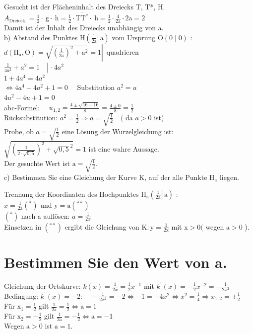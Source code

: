 \documentclass[10pt]{article}
\begin{document}
Gesucht ist der Flächeninhalt des Dreiecks T, T*, H.\\
$A_{\text {Dreieck }}=\frac{1}{2} \cdot \mathrm{~g} \cdot \mathrm{~h}=\frac{1}{2} \cdot \overline{\mathrm{TT}^{*}} \cdot \mathrm{~h}=\frac{1}{2} \cdot \frac{4}{2 \mathrm{a}} \cdot 2 \mathrm{a}=2$\\
Damit ist der Inhalt des Dreiecks unabhängig von a.\\
b) Abstand des Punktes $\mathrm{H}\left(\left.\frac{1}{2 \mathrm{a}} \right\rvert\, \mathrm{a}\right)$ vom Ursprung $\mathrm{O}(0 \mid 0)$ :\\
$\left.d\left(\mathrm{H}_{\mathrm{a}}, \mathrm{O}\right)=\sqrt{\left(\frac{1}{2 \mathrm{a}}\right)^{2}+\mathrm{a}^{2}}=1 \right\rvert\,$ quadrieren\\
$\left.\frac{1}{4 a^{2}}+a^{2}=1 \quad \right\rvert\, \cdot 4 a^{2}$\\
$1+4 a^{4}=4 a^{2}$\\
$\Leftrightarrow 4 a^{4}-4 a^{2}+1=0 \quad$ Substitution $a^{2}=u$\\
$4 u^{2}-4 u+1=0$\\
abc-Formel: $\quad u_{1,2}=\frac{4 \pm \sqrt{16-16}}{8}=\frac{4 \pm 0}{8}=\frac{1}{2}$\\
Rücksubstitution: $a^{2}=\frac{1}{2} \Rightarrow a=\sqrt{\frac{1}{2}} \quad($ da $a>0$ ist)\\
Probe, ob $a=\sqrt{\frac{1}{2}}$ eine Lösung der Wurzelgleichung ist:\\
$\sqrt{\left(\frac{1}{2 \cdot \sqrt{0,5}}\right)^{2}+\sqrt{0,5}^{2}}=1$ ist eine wahre Aussage.\\
Der gesuchte Wert ist $\mathrm{a}=\sqrt{\frac{1}{2}}$.\\
c) Bestimmen Sie eine Gleichung der Kurve K, auf der alle Punkte $\mathrm{H}_{\mathrm{a}}$ liegen.

Trennung der Koordinaten des Hochpunktes $\mathrm{H}_{\mathrm{a}}\left(\left.\frac{1}{2 \mathrm{a}} \right\rvert\, \mathrm{a}\right)$ :\\
$x=\frac{1}{2 \mathrm{a}}\left({ }^{*}\right)$ und $\mathrm{y}=\mathrm{a}\left({ }^{* *}\right)$\\
$\left(^{*}\right)$ nach a auflösen: $a=\frac{1}{2 x}$\\
Einsetzen in $\left(^{* *}\right)$ ergibt die Gleichung von $\mathrm{K}: \mathrm{y}=\frac{1}{2 \mathrm{x}}$ mit $\mathrm{x}>0($ wegen $\mathrm{a}>0$ ).

\section*{Bestimmen Sie den Wert von a.}
Gleichung der Ortskurve: $k(x)=\frac{1}{2 x}=\frac{1}{2} x^{-1}$ mit $k^{\prime}(x)=-\frac{1}{2} x^{-2}=-\frac{1}{2 x^{2}}$\\
Bedingung: $k^{\prime}(x)=-2: \quad-\frac{1}{2 x^{2}}=-2 \Leftrightarrow-1=-4 x^{2} \Leftrightarrow x^{2}=\frac{1}{4} \Rightarrow x_{1,2}= \pm \frac{1}{2}$\\
Für $\mathrm{x}_{1}=\frac{1}{2}$ gilt $\frac{1}{2 \mathrm{a}}=\frac{1}{2} \Leftrightarrow \mathrm{a}=1$\\
Für $\mathrm{x}_{2}=-\frac{1}{2}$ gilt $\frac{1}{2 \mathrm{a}}=-\frac{1}{2} \Leftrightarrow \mathrm{a}=-1$\\
Wegen $\mathrm{a}>0$ ist $\mathrm{a}=1$.
\end{document}
